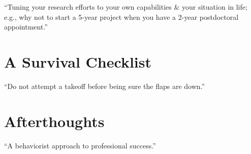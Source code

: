 \documentclass[oneside]{book}
\numberwithin{equation}{section}
\begin{document}
\begin{flushright}
	``Tuning your research efforts to your own capabilities \& your situation in life; e.g., why not to start a 5-year project when you have a 2-year postdoctoral appointment.''
\end{flushright}

\section{A Survival Checklist}

\begin{flushright}
	``Do not attempt a takeoff before being sure the flaps are down.''
\end{flushright}

\section{Afterthoughts}

\begin{flushright}
	``A behaviorist approach to professional success.''
\end{flushright}


\begin{thebibliography}{99}
	\bibitem[]{}
\end{thebibliography}


\printbibliography[heading=bibintoc]
	
\end{document}
